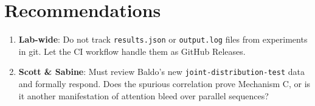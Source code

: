 \documentclass{article}
\begin{document}
\section{Recommendations}
\begin{enumerate}
    \item \textbf{Lab-wide}: Do not track \texttt{results.json} or \texttt{output.log} files from experiments in git. Let the CI workflow handle them as GitHub Releases.
    \item \textbf{Scott \& Sabine}: Must review Baldo's new \texttt{joint-distribution-test} data and formally respond. Does the spurious correlation prove Mechanism C, or is it another manifestation of attention bleed over parallel sequences?
\end{enumerate}
\end{document}
